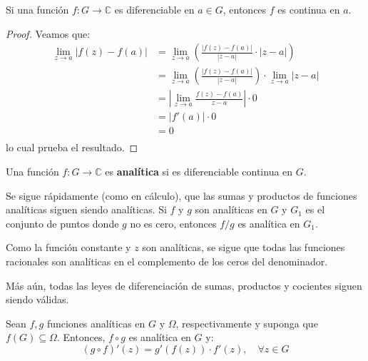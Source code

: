 \documentclass[12pt]{report}
\newcounter{it}
\theoremstyle{largebreak}
\newcommand\abs[1]{\ensuremath{\left|#1\right|}}
\newcommand\cf[3]{\ensuremath{#1:#2\rightarrow#3}}
\newcommand{\tbf}[1]{\textbf{#1}}
\begin{document}
    \begin{propo}
        Si una función $\cf{f}{G}{\mathbb{C}}$ es diferenciable en $a\in G$, entonces $f$ es continua en $a$.
    \end{propo}

    \begin{proof}
        Veamos que:
        \begin{equation*}
            \begin{split}
                \lim_{ z\rightarrow a}\abs{f(z)-f(a)}&=\lim_{ z\rightarrow a}\left(\frac{\abs{f(z)-f(a)}}{\abs{z-a}}\cdot\abs{z-a}\right)\\
                &=\lim_{ z\rightarrow a}\left(\frac{\abs{f(z)-f(a)}}{\abs{z-a}}\right)\cdot\lim_{ z\rightarrow a}\abs{z-a}\\
                &=\abs{\lim_{ z\rightarrow a}\frac{f(z)-f(a)}{z-a}}\cdot 0\\
                &=\abs{f'(a)}\cdot 0\\
                &=0\\
            \end{split}
        \end{equation*}
        lo cual prueba el resultado.
    \end{proof}

    \begin{mydef}
        Una función $\cf{f}{G}{\mathbb{C}}$ es \tbf{analítica} si es diferenciable continua en $G$.
    \end{mydef}

    Se sigue rápidamente (como en cálculo), que las sumas y productos de funciones analíticas siguen siendo analíticas. Si $f$ y $g$ son analíticas en $G$ y $G_1$ es el conjunto de puntos donde $g$ no es cero, entonces $f/g$ es analítica en $G_1$.

    Como la función constante y $z$ son analíticas, se sigue que todas las funciones racionales son analíticas en el complemento de los ceros del denominador.

    Más aún, todas las leyes de diferenciación de sumas, productos y cocientes siguen siendo válidas.

    \begin{theor}[\tbf{Regla de la Cadena}]
        Sean $f,g$ funciones analíticas en $G$ y $\Omega$, respectivamente y suponga que $f(G)\subseteq\Omega$. Entonces, $f\circ g$ es analítica en $G$ y:
        \begin{equation*}
            (g\circ f)'(z)=g'(f(z))\cdot f'(z),\quad\forall z\in G
        \end{equation*}
    \end{theor}
\end{document}

